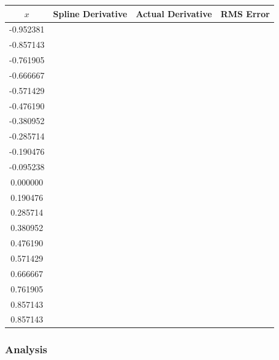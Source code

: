 \documentclass[11pt]{article} %
\begin{document}
\begin{tabular}{| c | c c c |}
\hline
$x$ & Spline Derivative & Actual Derivative & RMS Error\\
\hline
-0.952381 &  &  & \\
-0.857143 &  &  & \\
-0.761905 &  & &  \\
-0.666667 &  & &  \\
-0.571429 &  & &  \\
-0.476190 & & &  \\
-0.380952 &  & &  \\
-0.285714 &  & &  \\
-0.190476 &  & &  \\
-0.095238 &  & &  \\
0.000000 &  & &  \\
0.190476 &  & &  \\
0.285714 & & &  \\
0.380952 &  & &  \\
0.476190 &  & &  \\
0.571429 &  & &  \\
0.666667 &  & &  \\
0.761905 &  & &  \\
0.857143 &  & &  \\
0.857143 &  & &  \\

\hline
\end{tabular}


\subsubsection*{Analysis}
\end{document}
